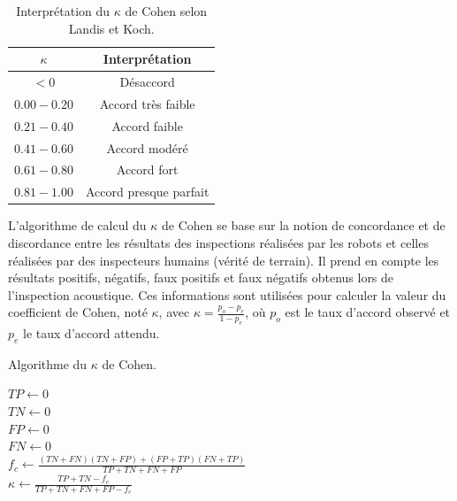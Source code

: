 \documentclass[english,RandD]{rapportPFE}  %
\begin{document}
			\begin{table}[h!]
				\centering
				\begin{tabular}{|c|c|}
					\hline
					$\kappa$ & Interprétation \\
					\hline
					$< 0$ & Désaccord \\
					\hline
					$0.00 - 0.20$ & Accord très faible \\
					\hline
					$0.21 - 0.40$ & Accord faible \\
					\hline
					$0.41 - 0.60$ & Accord modéré \\
					\hline
					$0.61 - 0.80$ & Accord fort \\
					\hline
					$0.81 - 1.00$ & Accord presque parfait \\
					\hline
				\end{tabular}
				\caption{Interprétation du $\kappa$ de Cohen selon Landis et Koch.}
				\label{tab:Kappa_Cohen}
			\end{table}

			L'algorithme de calcul du $\kappa$ de Cohen se base sur la notion de concordance et de discordance entre les résultats des inspections réalisées par les robots et celles réalisées par des inspecteurs humains (vérité de terrain).
			Il prend en compte les résultats positifs, négatifs, faux positifs et faux négatifs obtenus lors de l'inspection acoustique.
			Ces informations sont utilisées pour calculer la valeur du coefficient de Cohen, noté $\kappa$, avec $\kappa = \frac{p_o - p_e}{1 - p_e}$, où $p_o$ est le taux d'accord observé et $p_e$ le taux d'accord attendu.

			\begin{algorithm}[h!]
				\caption{Algorithme du $\kappa$ de Cohen.}
				\label{alg:Cohen_Kappa}
				\KwResult{$\kappa \in [0, 1]$}
				$TP \gets 0$ \\
				$TN \gets 0$ \\
				$FP \gets 0$ \\
				$FN \gets 0$ \\
				$f_c \gets \frac{(TN + FN) (TN + FP) + (FP + TP) (FN + TP)}{TP + TN + FN +FP}$ \\
				$\kappa \gets \frac{TP + TN - f_c}{TP + TN + FN + FP - f_c}$
			\end{algorithm}
\end{document}
